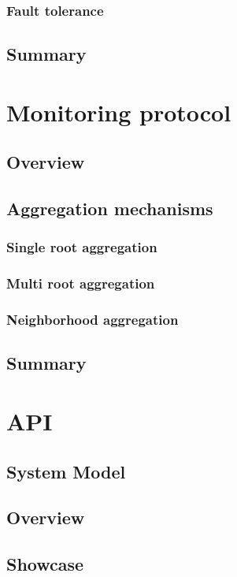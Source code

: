 \subsubsection{Fault tolerance}

\subsection{Summary}

\section{Monitoring protocol}

\subsection{Overview}

\subsection{Aggregation mechanisms}

\subsubsection{Single root aggregation}

\subsubsection{Multi root aggregation}

\subsubsection{Neighborhood aggregation}

\subsection{Summary}

\section{API}

\subsection{System Model}

\subsection{Overview}

\subsection{Showcase}

